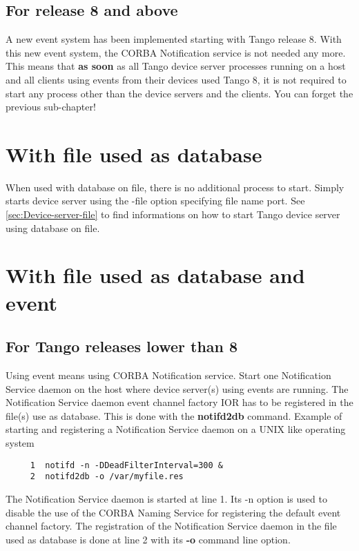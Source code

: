 \subsection{For release 8 and above}

A new event system has been implemented starting with Tango release
8. With this new event system, the CORBA Notification service is not
needed any more. This means that \textbf{as soon} as all Tango device
server processes running on a host and all clients using events from
their devices used Tango 8, it is not required to start any process
other than the device servers and the clients. You can forget the
previous sub-chapter!


\section{With file used as database}

When used with database on file, there is no additional
process to start. Simply starts device server using the -file option
specifying file name port. See \ref{sec:Device-server-file} to find
informations on how to start Tango device server using database on
file.


\section{With file used as database and event}


\subsection{For Tango releases lower than 8}

Using event means using CORBA Notification service. Start one Notification
Service daemon on the host where device
server(s) using events are running. The Notification Service daemon
event channel factory IOR has to be registered in the file(s) use
as database. This is done with the \textbf{notifd2db}
command. Example of starting and registering a Notification Service
daemon on a UNIX like operating system


\begin{verbatim}
     1  notifd -n -DDeadFilterInterval=300 &
     2  notifd2db -o /var/myfile.res
\end{verbatim}


The Notification Service daemon is started at line 1. Its \textquotedbl{}-n\textquotedbl{}
option is used to disable the use of the CORBA Naming Service for
registering the default event channel factory. The registration of
the Notification Service daemon in the file used as database is done
at line 2 with its \textbf{-o} command line option.

